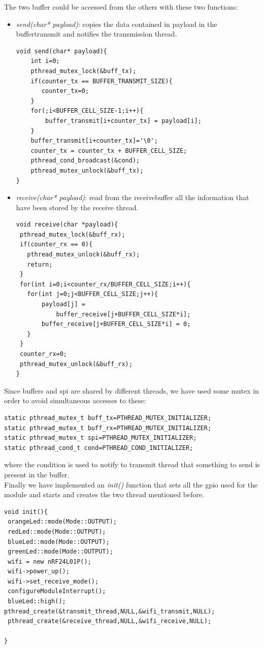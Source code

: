 \documentclass[11pt,a4paper,oneside]{article}
\begin{document}
The two buffer could be accessed from the others with these two functions:

\begin{itemize}
\item {\itshape send(char* payload)}: copies the data contained in payload in the buffer\textunderscore transmit and notifies the transmission thread.
\lstset{numbers=left,numberstyle=\tiny}
\begin{lstlisting}[frame=single]
void send(char* payload){
    int i=0;
    pthread_mutex_lock(&buff_tx);
    if(counter_tx == BUFFER_TRANSMIT_SIZE){
       counter_tx=0;
    }
    for(;i<BUFFER_CELL_SIZE-1;i++){
        buffer_transmit[i+counter_tx] = payload[i];
    }
    buffer_transmit[i+counter_tx]='\0';
    counter_tx = counter_tx + BUFFER_CELL_SIZE;
    pthread_cond_broadcast(&cond);
    pthread_mutex_unlock(&buff_tx);
}
\end{lstlisting}
\item {\itshape receive(char* payload)}: read from the receive\textunderscore buffer all the information that have been stored by the receive thread.
\lstset{numbers=left,numberstyle=\tiny}
\begin{lstlisting}[frame=single]
void receive(char *payload){
 pthread_mutex_lock(&buff_rx);
 if(counter_rx == 0){
   pthread_mutex_unlock(&buff_rx);
   return;
 }
 for(int i=0;i<counter_rx/BUFFER_CELL_SIZE;i++){
   for(int j=0;j<BUFFER_CELL_SIZE;j++){
       payload[j] = 
           buffer_receive[j+BUFFER_CELL_SIZE*i];
       buffer_receive[j+BUFFER_CELL_SIZE*i] = 0;
   }
 }
 counter_rx=0;
 pthread_mutex_unlock(&buff_rx);
}
\end{lstlisting}
\end{itemize}

Since buffers and spi are shared by different threads, we have used some mutex in order to avoid simultaneous accesses to these:
\lstset{numbers=left,numberstyle=\tiny}
\begin{lstlisting}[frame=single]
static pthread_mutex_t buff_tx=PTHREAD_MUTEX_INITIALIZER;
static pthread_mutex_t buff_rx=PTHREAD_MUTEX_INITIALIZER;
static pthread_mutex_t spi=PTHREAD_MUTEX_INITIALIZER;
static pthread_cond_t cond=PTHREAD_COND_INITIALIZER;
\end{lstlisting}

where the condition is used to notify to transmit thread that something to send is present in the buffer.
\\
Finally we have implemented an {\itshape init()} function that sets all the gpio used for the module and starts and creates the two thread mentioned before.
\lstset{numbers=left,numberstyle=\tiny}
\begin{lstlisting}[frame=single]
void init(){
 orangeLed::mode(Mode::OUTPUT);
 redLed::mode(Mode::OUTPUT);
 blueLed::mode(Mode::OUTPUT);
 greenLed::mode(Mode::OUTPUT);
 wifi = new nRF24L01P();
 wifi->power_up();
 wifi->set_receive_mode();
 configureModuleInterrupt();
 blueLed::high();
pthread_create(&transmit_thread,NULL,&wifi_transmit,NULL);
 pthread_create(&receive_thread,NULL,&wifi_receive,NULL);

}
\end{lstlisting}
\end{document}
